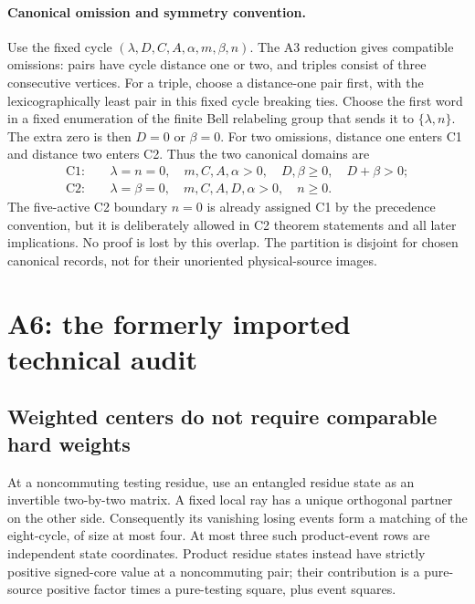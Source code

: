 \documentclass[11pt]{article}
\begin{document}
\paragraph{Canonical omission and symmetry convention.}
Use the fixed cycle
$(\lambda,D,C,A,\alpha,m,\beta,n)$.
The A3 reduction gives compatible omissions: pairs have cycle distance
one or two, and triples consist of three consecutive vertices.
For a triple, choose a distance-one pair first, with the lexicographically
least pair in this fixed cycle breaking ties. Choose the first word in
a fixed enumeration of the finite Bell relabeling group that sends it
to $\{\lambda,n\}$. The extra zero is then $D=0$ or $\beta=0$.
For two omissions, distance one enters C1 and distance two enters C2.
Thus the two canonical domains are
\begin{align*}
\mathrm{C1}:&\quad \lambda=n=0,\quad m,C,A,\alpha>0,\quad
 D,\beta\ge0,\quad D+\beta>0;\\
\mathrm{C2}:&\quad \lambda=\beta=0,\quad m,C,A,D,\alpha>0,
 \quad n\ge0.
\end{align*}
The five-active C2 boundary $n=0$ is already assigned C1 by the
precedence convention, but it is deliberately allowed in C2 theorem
statements and all later implications. No proof is lost by this overlap.
The partition is disjoint for chosen canonical records, not for their
unoriented physical-source images.

\section{A6: the formerly imported technical audit}

\subsection{Weighted centers do not require comparable hard weights}

At a noncommuting testing residue, use an entangled residue state as an
invertible two-by-two matrix. A fixed local ray has a unique orthogonal
partner on the other side. Consequently its vanishing losing events
form a matching of the eight-cycle, of size at most four. At most three
such product-event rows are independent state coordinates. Product
residue states instead have strictly positive signed-core value at a
noncommuting pair; their contribution is a pure-source positive factor
times a pure-testing square, plus event squares.
\end{document}

